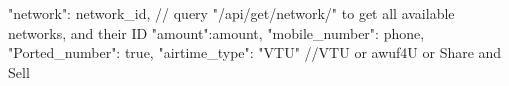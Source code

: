 {
    "network": network_id, // query "/api/get/network/"  to get all available networks, and their ID
    "amount":amount,
    "mobile_number": phone,
    "Ported_number": true,
    "airtime_type": "VTU" //VTU or awuf4U or Share and Sell
}